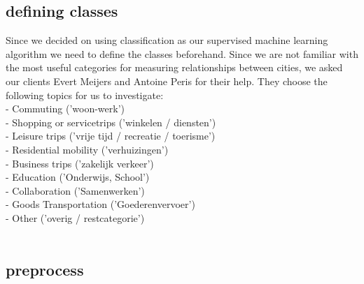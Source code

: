 \subsection{defining classes}
Since we decided on using classification as our supervised machine learning algorithm we need to define the classes beforehand. Since we are not familiar with the most useful categories for measuring relationships between cities, we asked our clients Evert Meijers and Antoine Peris for their help. They choose the following topics for us to investigate:\\
- Commuting ('woon-werk') \\
- Shopping or servicetrips ('winkelen / diensten') \\
- Leisure trips ('vrije tijd / recreatie / toerisme') \\
- Residential mobility ('verhuizingen') \\
- Business trips ('zakelijk verkeer') \\
- Education ('Onderwijs, School') \\
- Collaboration ('Samenwerken') \\
- Goods Transportation ('Goederenvervoer') \\
- Other ('overig / restcategorie') \\
\\


\subsection{preprocess}

